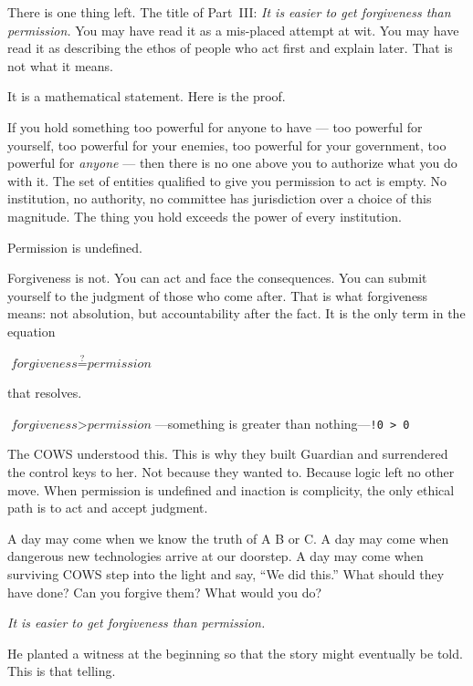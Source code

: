 There is one thing left. The title of Part~III: \textit{It is easier to get forgiveness than permission.} You may have read it as a mis-placed attempt at wit. You may have read it as describing the ethos of people who act first and explain later. That is not what it means.

It is a mathematical statement. Here is the proof.

If you hold something too powerful for anyone to have --- too powerful for yourself, too powerful for your enemies, too powerful for your government, too powerful for \textit{anyone} --- then there is no one above you to authorize what you do with it. The set of entities qualified to give you permission to act is empty. No institution, no authority, no committee has jurisdiction over a choice of this magnitude. The thing you hold exceeds the power of every institution.

Permission is undefined.

Forgiveness is not. You can act and face the consequences. You can submit yourself to the judgment of those who come after. That is what forgiveness means: not absolution, but accountability after the fact. It is the only term in the equation

\begin{center}
$\textit{forgiveness} \stackrel{?}{=} \textit{permission}$
\end{center}

\noindent that resolves.

\begin{center}
$\textit{forgiveness} > \textit{permission}$\quad---\quad something is greater than nothing\quad---\quad \texttt{!0 > 0}
\end{center}

The COWS understood this. This is why they built Guardian and surrendered the control keys to her. Not because they wanted to. Because logic left no other move. When permission is undefined and inaction is complicity, the only ethical path is to act and accept judgment.

A day may come when we know the truth of A B or C. A day may come when dangerous new technologies arrive at our doorstep. A day may come when surviving COWS step into the light and say, ``We did this.'' What should they have done? Can you forgive them? What would you do?
\vspace{1cm}

\begin{center}
\large\textit{It is easier to get forgiveness than permission.}
\end{center}

\vspace{1cm}

He planted a witness at the beginning so that the story might eventually be told. This is that telling.

\chapterreturn
